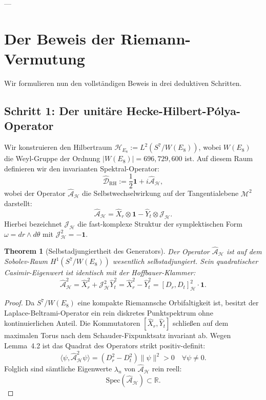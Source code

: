 \documentclass[11pt,a4paper]{article}
\newtheorem{theorem}{Theorem}[section]
\theoremstyle{definition}
\theoremstyle{remark}
\numberwithin{equation}{section}
\begin{document}
---

\section{Der Beweis der Riemann-Vermutung}

Wir formulieren nun den vollständigen Beweis in drei deduktiven Schritten.

\subsection{Schritt 1: Der unitäre Hecke-Hilbert-Pólya-Operator}

Wir konstruieren den Hilbertraum $\mathcal{H}_{E_8} := L^2(S^7 / W(E_8))$, wobei $W(E_8)$ die Weyl-Gruppe der Ordnung $|W(E_8)| = 696{,}729{,}600$ ist. Auf diesem Raum definieren wir den invarianten Spektral-Operator:
\begin{equation}
\hat{\mathcal{D}}_{\mathrm{RH}} := \frac{1}{2} \mathbf{1} + i \hat{\mathcal{A}}_{\mathcal{H}},
\end{equation}
wobei der Operator $\hat{\mathcal{A}}_{\mathcal{H}}$ die Selbstwechselwirkung auf der Tangentialebene $\mathcal{M}^2$ darstellt:
\begin{equation}
\hat{\mathcal{A}}_{\mathcal{H}} = \hat{X}_r \otimes \mathbf{1} - \hat{Y}_t \otimes \mathcal{J}_{\mathcal{H}}.
\end{equation}
Hierbei bezeichnet $\mathcal{J}_{\mathcal{H}}$ die fast-komplexe Struktur der symplektischen Form $\omega = dr \wedge d\theta$ mit $\mathcal{J}_{\mathcal{H}}^2 = -\mathbf{1}$.

\begin{theorem}[Selbstadjungiertheit des Generators]
Der Operator $\hat{\mathcal{A}}_{\mathcal{H}}$ ist auf dem Sobolev-Raum $H^1(S^7/W(E_8))$ wesentlich selbstadjungiert. Sein quadratischer Casimir-Eigenwert ist identisch mit der Hoffbauer-Klammer:
\begin{equation}
\hat{\mathcal{A}}_{\mathcal{H}}^2 = \hat{X}_r^2 + \mathcal{J}_{\mathcal{H}}^2 \hat{Y}_t^2 = \hat{X}_r^2 - \hat{Y}_t^2 = [D_r, D_t]_{\mathcal{H}}^2 \cdot \mathbf{1}.
\end{equation}
\end{theorem}

\begin{proof}
Da $S^7 / W(E_8)$ eine kompakte Riemannsche Orbifaltigkeit ist, besitzt der Laplace-Beltrami-Operator ein rein diskretes Punktspektrum ohne kontinuierlichen Anteil. Die Kommutatoren $[\hat{X}_r, \hat{Y}_t]$ schließen auf dem maximalen Torus nach dem Schauder-Fixpunktsatz invariant ab. Wegen Lemma~4.2 ist das Quadrat des Operators strikt positiv-definit:
\begin{equation}
\langle \psi, \hat{\mathcal{A}}_{\mathcal{H}}^2 \psi \rangle = (D_r^2 - D_t^2) \|\psi\|^2 > 0 \quad \forall \psi \neq 0.
\end{equation}
Folglich sind sämtliche Eigenwerte $\lambda_n$ von $\hat{\mathcal{A}}_{\mathcal{H}}$ rein reell:
\begin{equation}
\mathrm{Spec}(\hat{\mathcal{A}}_{\mathcal{H}}) \subset \mathbb{R}.
\end{equation}
\end{proof}
\end{document}
